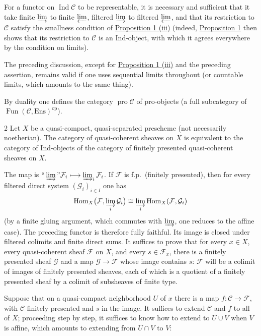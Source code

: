 For a functor on $\operatorname{Ind}\mathcal C$ to be representable, it is necessary and sufficient that it take finite $\varinjlim$ to finite $\varprojlim$, filtered $\varinjlim$ to filtered $\varprojlim$, and that its restriction to $\mathcal C$ satisfy the smallness condition of \hyperref[appen:prop1]{Proposition 1 (iii)} (indeed, \hyperref[appen:prop1]{Proposition 1} then shows that its restriction to $\mathcal C$ is an Ind-object, with which it agrees everywhere by the condition on limits).

The preceding discussion, except for \hyperref[appen:prop1]{Proposition 1 (iii)} and the preceding assertion, remains valid if one uses sequential limits throughout (or countable limits, which amounts to the same thing).

By duality one defines the category $\operatorname{pro}\mathcal C$ of pro-objects (a full subcategory of $\operatorname{Fun}(\mathcal C,\mathrm{Ens})^{\mathrm{op}}$).

\begin{bookproposition}{2}\label{appen:prop2}
Let $X$ be a quasi-compact, quasi-separated prescheme (not necessarily noetherian). The category of quasi-coherent sheaves on $X$ is equivalent to the category of Ind-objects of the category of finitely presented quasi-coherent sheaves on $X$.
\end{bookproposition}

The map is $\text{``}\varinjlim\text{''}\mathcal F_i\longmapsto\varinjlim_i\mathcal F_i$. If $\mathcal F$ is f.p.\ (finitely presented), then for every filtered direct system $(\mathcal G_i)_{i\in I}$ one has
\[
\operatorname{Hom}_X\bigl(\mathcal F,\varinjlim_i\mathcal G_i\bigr)
\cong\varinjlim_i\operatorname{Hom}_X(\mathcal F,\mathcal G_i)
\] (by a finite gluing argument, which commutes with $\varinjlim$, one reduces to the affine case). The preceding functor is therefore fully faithful. Its image is closed under filtered colimits and finite direct sums. It suffices to prove that for every $x\in X$, every quasi-coherent sheaf $\mathcal F$ on $X$, and every $s\in\mathcal F_x$, there is a finitely presented sheaf $\mathcal G$ and a map $\mathcal G\to\mathcal F$ whose image contains $s$: $\mathcal F$ will be a colimit of images of finitely presented sheaves, each of which is a quotient of a finitely presented sheaf by a colimit of subsheaves of finite type.

Suppose that on a quasi-compact neighborhood $U$ of $x$ there is a map $f:\mathcal C\longrightarrow\mathcal F$, with $\mathcal C$ finitely presented and $s$ in the image. It suffices to extend $\mathcal C$ and $f$ to all of $X$; proceeding step by step, it suffices to know how to extend to $U\cup V$ when $V$ is affine, which amounts to extending from $U\cap V$ to $V$:

